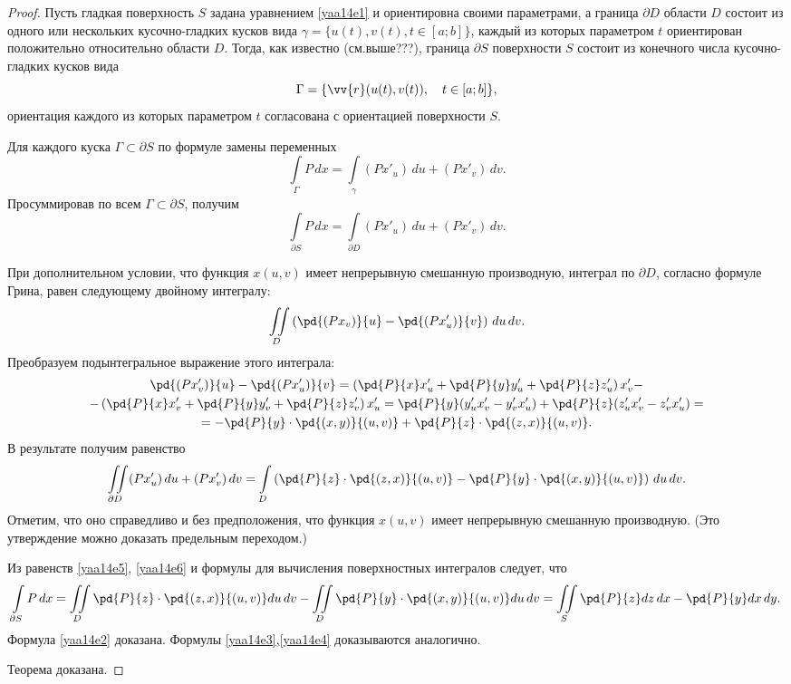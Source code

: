 \begin{proof}
Пусть гладкая поверхность $S$ задана уравнением \eqref{yaa14e1} и ориентировна своими параметрами, а граница $\partial D$ области $D$ состоит из одного или нескольких кусочно-гладких кусков вида $\gamma = \{u(t),v(t),t\in[a;b]\}$, каждый из которых параметром $t$ ориентирован положительно относительно области $D$. Тогда, как известно (см.выше???), граница $\partial S$ поверхности $S$ состоит из конечного числа кусочно-гладких кусков вида
$$
\Gamma = \{\vv{r}(u(t),v(t)),\quad t\in[a;b]\},
$$
ориентация каждого из которых параметром $t$ согласована с ориентацией поверхности $S$.

Для каждого куска $\Gamma\subset\partial S$ по формуле замены переменных
$$
\int\limits_{\Gamma} P\,dx = \int\limits_\gamma (Px'_u)\,du+(Px'_v)\,dv.
$$
Просуммировав по всем $\Gamma\subset\partial S$, получим
\begin{equation} \label{yaa14e5}
\int\limits_{\partial S} P\,dx = \int\limits_{\partial D} (Px'_u)\,du+(Px'_v)\,dv.
\end{equation}

При дополнительном условии, что функция $x(u,v)$ имеет непрерывную смешанную производную, интеграл по $\partial D$, согласно формуле Грина, равен следующему двойному интегралу:
$$
\iint\limits_D\left(\pd{(Px_v)}{u} -\pd{(Px'_u)}{v}\right)\,du\,dv.
$$
Преобразуем подынтегральное выражение этого интеграла:
\begin{multline*}
\pd{(Px'_v)}{u} - \pd{(Px'_u)}{v}
=\left(\pd{P}{x}x'_u+\pd{P}{y}y'_u+\pd{P}{z}z'_u\right)x'_v-\\-\left(\pd{P}{x}x'_v+\pd{P}{y}y'_v+\pd{P}{z}z'_v\right)x'_u = \pd{P}{y}(y'_ux'_v-y'_vx'_u)+\pd{P}{z}(z'_ux'_v-z'_vx'_u)=\\=-\pd{P}{y}\cdot \pd{(x,y)}{(u,v)}+\pd{P}{z}\cdot\pd{(z,x)}{(u,v)}.
\end{multline*}
В результате получим равенство
\begin{equation} \label{yaa14e6}
\iint\limits_{\partial D} (Px'_u)\,du+(Px'_v)\,dv = \int\limits_D\left(\pd{P}{z}\cdot\pd{(z,x)}{(u,v)}-\pd{P}{y}\cdot \pd{(x,y)}{(u,v)}\right)\,du\,dv.
\end{equation}
Отметим, что оно справедливо и без предположения, что функция $x(u,v)$ имеет непрерывную смешанную производную. (Это утверждение можно доказать предельным переходом.)

Из равенств \eqref{yaa14e5}, \eqref{yaa14e6} и формулы для вычисления поверхностных интегралов следует, что
$$
\int\limits_{\partial S} P\,dx = \iint\limits_D \pd{P}{z}\cdot\pd{(z,x)}{(u,v)}du\,dv -\iint\limits_D \pd{P}{y}\cdot\pd{(x,y)}{(u,v)}du\,dv = \iint\limits_S \pd{P}{z}dz\,dx-\pd{P}{y}dx\,dy.
$$
Формула \eqref{yaa14e2} доказана. Формулы \eqref{yaa14e3},\eqref{yaa14e4} доказываются аналогично.

Теорема доказана.
\end{proof}

